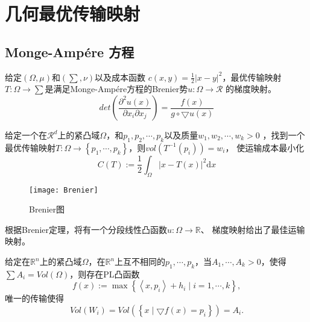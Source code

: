 \section{几何最优传输映射}

\subsection{Monge-Amp\'ere 方程}

\begin{problem}[Brenier] \label{pro: Brenier}
    给定$(\Omega, \mu)$和$(\sum, \nu)$以及成本函数 $c(x,y)=\frac{1}{2}\left | x-y \right |^2 $，最优传输映射$T: \Omega \to \sum$是满足Monge-Amp\'ere方程的Brenier势$u:\Omega \to \mathcal{R}$
    的梯度映射。
    \begin{equation}
        \boxed{ det \left ( \frac{\partial ^2 u(x)}{\partial x_i \partial x_j}  \right ) = \frac{f(x)}{g \circ \bigtriangledown u(x)}  }
        \label{equ:Monge-Amp\'ere}
    \end{equation}
\end{problem}

\begin{problem}\label{pro: Semi-discrete OT}
    给定一个在$\mathcal{R}^d$上的紧凸域$\Omega$，和$p_1,p_2,\cdots , p_k$以及质量$w_1,w_2, \cdots , w_k >0$ ，找到一个最优传输映射$T:\Omega \to \left \{ p_1,\cdots ,p_k \right \}$，则$vol(T^{-1}(p_i))=w_i$，
    使运输成本最小化
    \begin{equation}
        C(T):=\frac{1}{2} \int _{\Omega} \left | x-T(x) \right |^2 \mathrm{d}x
        \label{equ:cost} 
    \end{equation}
\end{problem}

\begin{figure}
    [h]
	\centering
	\texttt{[image: Brenier]}
	\caption{ Brenier图}
	\label{fig: Brenier}
\end{figure}

根据Brenier定理，将有一个分段线性凸函数$u:\Omega \to \mathbb{R}$、 梯度映射给出了最佳运输映射。

\begin{theorem}[Alexandrov 1950]
    给定在$\mathbb{R}^n$上的紧凸域$\Omega$，在$\mathbb{R}^n$上互不相同的$p_1, \cdots , p_k$，当$A_1,\cdots ,A_k >0$，使得 $\sum A_i =Vol(\Omega)$，则存在PL凸函数
    \begin{equation}
        f(x):=\max \left \{ \left \langle x,p_i \right \rangle +h_i \mid i=1, \cdots , k  \right \} ,
        \label{equ:PL convex}
    \end{equation}
    唯一的传输使得
	\begin{equation}
        Vol(W_i)=Vol\left ( \left \{ x \mid \bigtriangledown f(x)=p_i \right \}  \right ) =A_i. 
        \label{equ:Vol}
    \end{equation}
\end{theorem}

